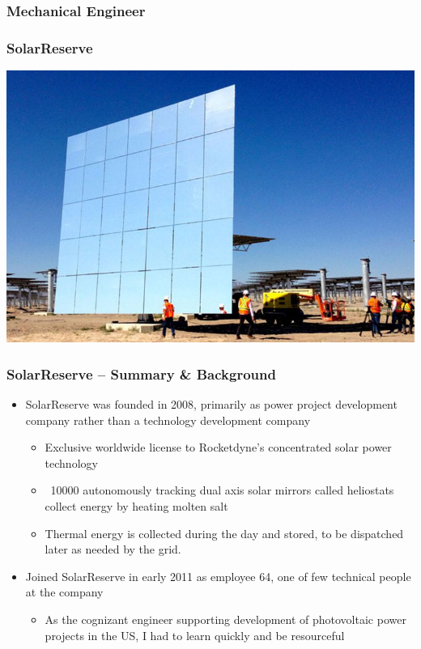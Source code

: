 \documentclass[aspectratio=169]{beamer}
\begin{document}
\subsubsection{Mechanical Engineer}

\begin{frame}
  \frametitle{SolarReserve}
  \center
  \includegraphics[width=.7\linewidth]{HeliostatImage.jpeg}
\end{frame}

\begin{frame}
  \frametitle{SolarReserve -- Summary \& Background}
  \begin{itemize}
  \item SolarReserve was founded in 2008, primarily as power project
    development company rather than a technology development company
    \begin{itemize}
    \item Exclusive worldwide license to Rocketdyne's concentrated
      solar power technology
    \item ~10000 autonomously tracking dual axis solar
      mirrors called heliostats collect energy by heating molten
      salt
    \item Thermal energy is collected during the day and stored, to
      be dispatched later as needed by the grid.
    \end{itemize}
  \item Joined SolarReserve in early 2011 as employee 64, one
    of few technical people at the company
    \begin{itemize}
    \item As the cognizant engineer supporting development of
      photovoltaic power projects in the US, I had to learn quickly
      and be resourceful %
      \end{itemize}
  \end{itemize}
\end{frame}
\end{document}
